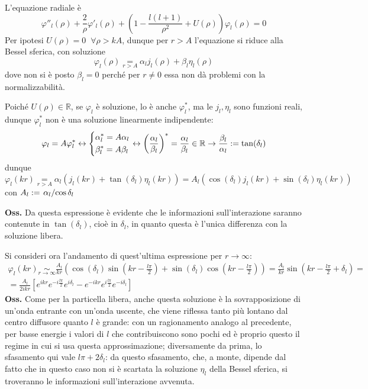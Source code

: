 L'equazione radiale è
$$\varphi''_l(\rho) + \frac{2}{\rho}\varphi'_l(\rho) + \left(1-\frac{l(l+1)}{\rho^2}+U(\rho)\right)
\varphi_l(\rho)=0$$
Per ipotesi $U(\rho) = 0\phantom{x}\forall \rho>kA$, dunque per $r>A$
l'equazione si riduce alla Bessel sferica, con soluzione
$$\varphi_l(\rho)\underset{r>A}=\alpha_lj_l(\rho)+\beta_l\eta_l(\rho)$$
dove non si è posto $\beta_l=0$ perché per $r\not=0$ essa non dà problemi con la normalizzabilità.

Poiché $U(\rho)\in\mathbb{R}$, se $\varphi_l$ è soluzione, lo è anche $\varphi_l^*$, ma le
$j_l,\eta_l$ sono funzioni reali, dunque $\varphi^*_l$ non è una soluzione linearmente indipendente:
$$\varphi_l=A\varphi^*_l \leftrightarrow
\begin{dcases}
\alpha^*_l = A\alpha_l \\
\beta^*_l= A\beta_l
\end{dcases}\leftrightarrow
\left(\frac{\alpha_l}{\beta_l}\right)^* = \frac{\alpha_l}{\beta_l}\in\mathbb{R}\rightarrow
\frac{\beta_l}{\alpha_l}:=\tan(\delta_l)
$$
dunque
$$\varphi_l(kr) \underset{r>A}= \alpha_l\left(j_l(kr)+\tan(\delta_l)\eta_l(kr)\right) = 
A_l(\cos(\delta_l)j_l(kr)+\sin(\delta_l)\eta_l(kr))
$$
con $A_l:=\flatfrac{\alpha_l}{\cos\delta_l}$

\textbf{Oss.} Da questa espressione è evidente che le informazioni sull'interazione saranno
contenute in $\tan(\delta_l)$, cioè in $\delta_l$, in quanto questa è l'unica differenza con la
soluzione libera.

Si consideri ora l'andamento di quest'ultima espressione per $r\to\infty$:
\begin{gather*}
\varphi_l(kr)\underset{r\to\infty}\sim\frac{A_l}{kr}\left(\cos(\delta_l)\sin\left(kr-\frac{l\pi}{2}
\right)+\sin(\delta_l)\cos\left(kr-\frac{l\pi}{2}\right)\right)=\frac{A_l}{kr}
\sin\left(kr-\frac{l\pi}{2}+\delta_l\right)=\\
=\frac{A_l}{2ikr}\left[e^{ikr}e^{-i\frac{l\pi}{2}}e^{i\delta_l}-
e^{-ikr}e^{i\frac{l\pi}{2}}e^{-i\delta_l}\right]
\end{gather*}
\textbf{Oss.} Come per la particella libera, anche questa soluzione è la sovrapposizione di
un'onda entrante con un'onda uscente, che viene riflessa tanto più lontano dal centro diffusore quanto
$l$ è grande: con un ragionamento analogo al precedente, per basse energie i valori di $l$ che
contribuiscono sono pochi ed è proprio questo il regime in cui si usa questa approssimazione;
diversamente da prima, lo sfasamento qui vale $l\pi+2\delta_l$: da questo sfasamento, che, a monte,
dipende dal fatto che in questo caso non si è scartata la soluzione $\eta_l$ della Bessel sferica,
si troveranno le informazioni sull'interazione avvenuta.

